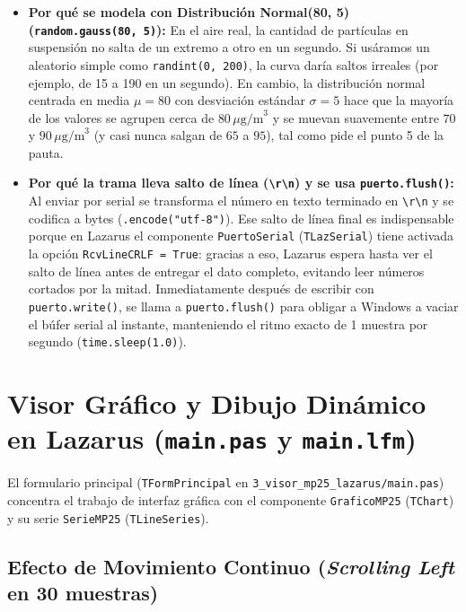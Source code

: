 \documentclass[11pt,a4paper]{article}
\begin{document}
\begin{itemize}[leftmargin=1.5em, itemsep=0.35em]
    \item \textbf{Por qué se modela con Distribución Normal(80, 5) (\texttt{random.gauss(80, 5)}):}
    En el aire real, la cantidad de partículas en suspensión no salta de un extremo a otro en un segundo. Si usáramos un aleatorio simple como \texttt{randint(0, 200)}, la curva daría saltos irreales (por ejemplo, de 15 a 190 en un segundo). En cambio, la distribución normal centrada en media $\mu = 80$ con desviación estándar $\sigma = 5$ hace que la mayoría de los valores se agrupen cerca de $80\,\mu\text{g/m}^3$ y se muevan suavemente entre $70$ y $90\,\mu\text{g/m}^3$ (y casi nunca salgan de $65$ a $95$), tal como pide el punto 5 de la pauta.

    \item \textbf{Por qué la trama lleva salto de línea (\texttt{\textbackslash r\textbackslash n}) y se usa \texttt{puerto.flush()}:}
    Al enviar por serial se transforma el número en texto terminado en \texttt{\textbackslash r\textbackslash n} y se codifica a bytes (\texttt{.encode("utf-8")}). Ese salto de línea final es indispensable porque en Lazarus el componente \texttt{PuertoSerial} (\texttt{TLazSerial}) tiene activada la opción \texttt{RcvLineCRLF = True}: gracias a eso, Lazarus espera hasta ver el salto de línea antes de entregar el dato completo, evitando leer números cortados por la mitad. Inmediatamente después de escribir con \texttt{puerto.write()}, se llama a \texttt{puerto.flush()} para obligar a Windows a vaciar el búfer serial al instante, manteniendo el ritmo exacto de 1 muestra por segundo (\texttt{time.sleep(1.0)}).
\end{itemize}

\section{Visor Gráfico y Dibujo Dinámico en Lazarus (\texttt{main.pas} y \texttt{main.lfm})}

El formulario principal (\texttt{TFormPrincipal} en \texttt{3\_visor\_mp25\_lazarus/main.pas}) concentra el trabajo de interfaz gráfica con el componente \texttt{GraficoMP25} (\texttt{TChart}) y su serie \texttt{SerieMP25} (\texttt{TLineSeries}).

\subsection{Efecto de Movimiento Continuo (\emph{Scrolling Left} en 30 muestras)}
\end{document}

